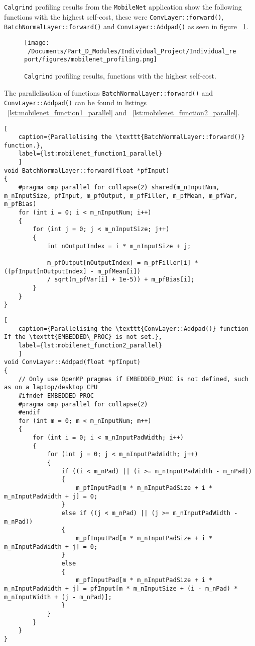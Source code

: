 \texttt{Calgrind} profiling results from the \texttt{MobileNet} application show the following functions with the highest self-cost, these were \texttt{ConvLayer::forward()}, \texttt{BatchNormalLayer::forward()} and \texttt{ConvLayer::Addpad()} as seen in figure ~\ref{fig:mobilenet_profiling}.

\begin{figure}[H] %
	\centering
	\texttt{[image: ~/Documents/Part\_D\_Modules/Individual\_Project/Individual\_report/figures/mobilenet\_profiling.png]} %
	\caption{\texttt{Calgrind} profiling results, functions with the highest self-cost.}
	\label{fig:mobilenet_profiling} %
\end{figure}


The parallelisation of functions \texttt{BatchNormalLayer::forward()} and \texttt{ConvLayer::Addpad()} can be found in listings ~\ref{lst:mobilenet_function1_parallel} and ~\ref{lst:mobilenet_function2_parallel}.

\begin{lstlisting}[
	caption={Parallelising the \texttt{BatchNormalLayer::forward()} function.},
	label={lst:mobilenet_function1_parallel}
	]
void BatchNormalLayer::forward(float *pfInput) 
{
	#pragma omp parallel for collapse(2) shared(m_nInputNum, m_nInputSize, pfInput, m_pfOutput, m_pfFiller, m_pfMean, m_pfVar, m_pfBias) 
	for (int i = 0; i < m_nInputNum; i++)
	{
		for (int j = 0; j < m_nInputSize; j++)
		{
			int nOutputIndex = i * m_nInputSize + j;
			
			m_pfOutput[nOutputIndex] = m_pfFiller[i] * ((pfInput[nOutputIndex] - m_pfMean[i])
			/ sqrt(m_pfVar[i] + 1e-5)) + m_pfBias[i];
		}
	}
}
\end{lstlisting}


\begin{lstlisting}[
	caption={Parallelising the \texttt{ConvLayer::Addpad()} function If the \texttt{EMBEDDED\_PROC} is not set.},
	label={lst:mobilenet_function2_parallel}
	]
void ConvLayer::Addpad(float *pfInput)
{
	// Only use OpenMP pragmas if EMBEDDED_PROC is not defined, such as on a laptop/desktop CPU 
	#ifndef EMBEDDED_PROC
	#pragma omp parallel for collapse(2)
	#endif
	for (int m = 0; m < m_nInputNum; m++)
	{
		for (int i = 0; i < m_nInputPadWidth; i++)
		{
			for (int j = 0; j < m_nInputPadWidth; j++)
			{
				if ((i < m_nPad) || (i >= m_nInputPadWidth - m_nPad))
				{
					m_pfInputPad[m * m_nInputPadSize + i * m_nInputPadWidth + j] = 0;
				}
				else if ((j < m_nPad) || (j >= m_nInputPadWidth - m_nPad))
				{
					m_pfInputPad[m * m_nInputPadSize + i * m_nInputPadWidth + j] = 0;
				}
				else
				{
					m_pfInputPad[m * m_nInputPadSize + i * m_nInputPadWidth + j] = pfInput[m * m_nInputSize + (i - m_nPad) * m_nInputWidth + (j - m_nPad)];
				}
			}
		}
	}
}
\end{lstlisting}


